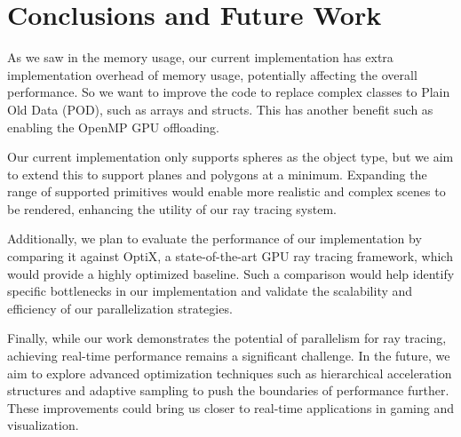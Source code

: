\section{Conclusions and Future Work}
\label{sec:conclusion-and-future-work}

As we saw in the memory usage, our current implementation has extra implementation overhead of memory usage, potentially affecting the overall performance. So we want to improve the code to replace complex classes to Plain Old Data (POD), such as arrays and structs. This has another benefit such as enabling the OpenMP GPU offloading.

Our current implementation only supports spheres as the object type, but we aim to extend this to support planes and polygons at a minimum. Expanding the range of supported primitives would enable more realistic and complex scenes to be rendered, enhancing the utility of our ray tracing system.

Additionally, we plan to evaluate the performance of our implementation by comparing it against OptiX\cite{nvidia_optix}, a state-of-the-art GPU ray tracing framework, which would provide a highly optimized baseline. Such a comparison would help identify specific bottlenecks in our implementation and validate the scalability and efficiency of our parallelization strategies.

Finally, while our work demonstrates the potential of parallelism for ray tracing, achieving real-time performance remains a significant challenge. In the future, we aim to explore advanced optimization techniques such as hierarchical acceleration structures and adaptive sampling to push the boundaries of performance further. These improvements could bring us closer to real-time applications in gaming and visualization.
